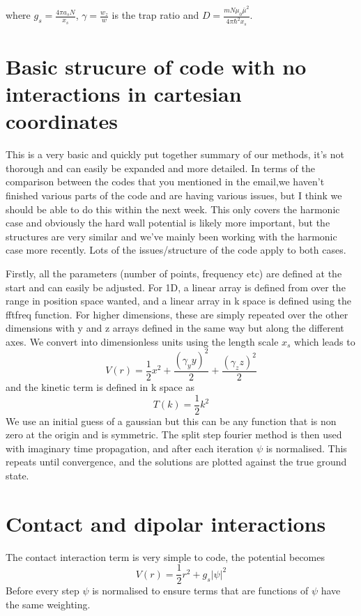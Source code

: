 \documentclass[10pt]{article}
\begin{document}
\begin{multicols}{2}
where $g_{s}=\frac{4 \pi a_{s} N}{x_{s}}$, $\gamma=\frac{w_{z}}{w}$ is the trap ratio and $D=\frac{m N \mu_{0} \bar{\mu}^2}{4 \pi \hbar^2 x_{s}}$.



\section{Basic strucure of code with no interactions in cartesian coordinates}
This is a very basic and quickly put together summary of our methods, it's not thorough and can easily be expanded and more detailed. In terms of the comparison between the codes that you mentioned in the email,we haven't finished various parts of the code and are having various issues, but I think we should be able to do this within the next week. This only covers the harmonic case and obviously the hard wall potential is likely more important, but the structures are very similar and we've mainly been working with the harmonic case more recently. Lots of the issues/structure of the code apply to both cases.

Firstly, all the parameters (number of points, frequency etc) are defined at the start and can easily be adjusted. For 1D, a linear array is defined from over the range in position space wanted, and a linear array in k space is defined using the fftfreq function. For higher dimensions, these are simply repeated over the other dimensions with y and z arrays defined in the same way but along the different axes. We convert into dimensionless units using the length scale $x_{s}$ which leads to 
\begin{equation}
V(r) = \frac{1}{2}x^{2}+\frac{(\gamma_yy)^{2}}{2}+\frac{(\gamma_zz)^{2}}{2}
\end{equation}
and the kinetic term is defined in k space as 
\begin{equation}
T(k) = \frac{1}{2}k^{2}
\end{equation} 
We use an initial guess of a gaussian but this can be any function that is non zero at the origin and is symmetric. The split step fourier method is then used with imaginary time propagation, and after each iteration $\psi$ is normalised. This repeats until convergence, and the solutions are plotted against the true ground state.
\section{Contact and dipolar interactions}
The contact interaction term is very simple to code, the potential becomes 
\begin{equation}
V(r) = \frac{1}{2}r^{2}+g_{s}|\psi|^{2}
\end{equation}
Before every step $\psi$ is normalised to ensure terms that are functions of $\psi$ have the same weighting.
 

\end{multicols}
\end{document}

